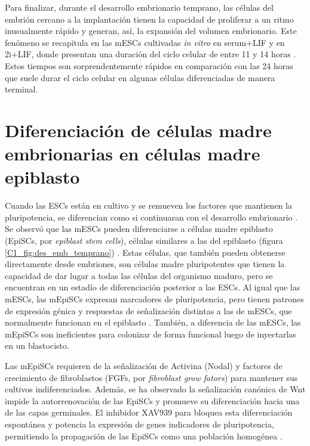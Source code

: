 \documentclass[./main.tex]{subfiles}
\begin{document}
Para finalizar, durante el desarrollo embrionario temprano, las células del embrión cercano a la implantación tienen la capacidad de proliferar a un ritmo inusualmente rápido y generan, así, la expansión del volumen embrionario. Este fenómeno se recapitula en las mESCs cultivadas \textit{in vitro} en serum+LIF y en 2i+LIF, donde presentan una duración del ciclo celular de entre 11 y 14 horas \cite{Waisman2019,Snow1977}. Estos tiempos son sorprendentemente rápidos en comparación con las 24 horas que suele durar el ciclo celular en algunas células diferenciadas de manera terminal. 



\section{Diferenciación de células madre embrionarias en células madre epiblasto}
\label{C1_sec:EpiSCs}
Cuando las ESCs están en cultivo y se remueven los factores que mantienen la pluripotencia, se diferencian como si continuaran con el desarrollo embrionario \cite{Keller1995,Keller2005}. Se observó que las mESCs pueden diferenciarse a células madre epiblasto (EpiSCs, por \textit{epiblast stem cells}), células similares a las del epiblasto (figura \ref{C1_fig:des_emb_temprano}) \cite{Kojima2014,Brons2007}. Estas células, que también pueden obtenerse directamente desde embriones, son células madre pluripotentes que tienen la capacidad de dar lugar a todas las células del organismo maduro, pero se encuentran en un estadío de diferenciación posterior a las ESCs. Al igual que las mESCs, las mEpiSCs expresan marcadores de pluripotencia, pero tienen patrones de expresión génica y respuestas de señalización distintas a las de mESCs, que normalmente funcionan en el epiblasto \cite{Tesar2007}. También, a diferencia de las mESCs, las mEpiSCs son ineficientes para colonizar de forma funcional luego de inyectarlas en un blastocisto.




Las mEpiSCs requieren de la señalización de Activina (Nodal) y factores de crecimiento de fibroblastos (FGFs, por \textit{fibroblast grow fators}) para mantener sus cultivos indiferenciados. Además, se ha observado la señalización canónica de Wnt impide la autorrenovación de las EpiSCs y promueve su diferenciación hacia una de las capas germinales. El inhibidor XAV939 para bloquea esta diferenciación espontánea y potencia la expresión de genes indicadores de pluripotencia, permitiendo la propagación de las EpiSCs como una población homogénea \cite{Guo2009,Tsukiyama2014,Brons2007,Sumi2013,Ying2003,Weinberger2016}. 
\end{document}
